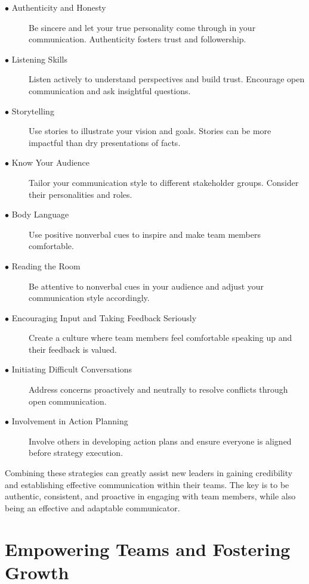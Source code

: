 \documentclass[runningheads]{llncs}
\begin{document}
\begin{description}
 \item [$\bullet$ Authenticity and Honesty] Be sincere and let your true personality come through in your communication. Authenticity fosters trust and followership.\\
 \item [$\bullet$ Listening Skills] Listen actively to understand perspectives and build trust. Encourage open communication and ask insightful questions.\\
 \item [$\bullet$ Storytelling] Use stories to illustrate your vision and goals. Stories can be more impactful than dry presentations of facts.\\
 \item [$\bullet$ Know Your Audience] Tailor your communication style to different stakeholder groups. Consider their personalities and roles.\\
 \item [$\bullet$ Body Language] Use positive nonverbal cues to inspire and make team members comfortable.\\
 \item [$\bullet$ Reading the Room] Be attentive to nonverbal cues in your audience and adjust your communication style accordingly.\\
 \item [$\bullet$ Encouraging Input and Taking Feedback Seriously] Create a culture where team members feel comfortable speaking up and their feedback is valued.\\
 \item [$\bullet$ Initiating Difficult Conversations] Address concerns proactively and neutrally to resolve conflicts through open communication.\\
 \item [$\bullet$ Involvement in Action Planning] Involve others in developing action plans and ensure everyone is aligned before strategy execution.\\

\end{description}
 
Combining these strategies can greatly assist new leaders in gaining credibility and establishing effective communication within their teams. The key is to be authentic, consistent, and proactive in engaging with team members, while also being an effective and adaptable communicator.

\section{Empowering Teams and Fostering Growth}
\end{document}
